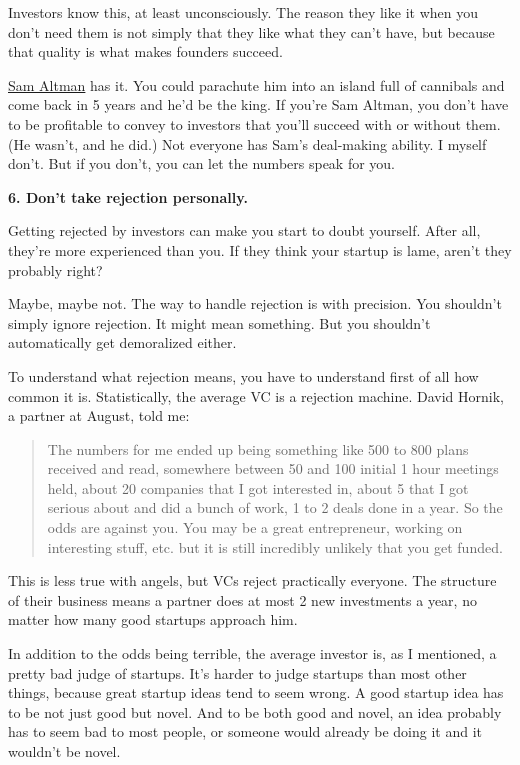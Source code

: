 Investors know this, at least unconsciously. The reason they like it
when you don't need them is not simply that they like what they can't
have, but because that quality is what makes founders succeed.

\href{http://www.youtube.com/watch?v=KhhId_WG7RA}{Sam Altman} has it.
You could parachute him into an island full of cannibals and come back
in 5 years and he'd be the king. If you're Sam Altman, you don't have to
be profitable to convey to investors that you'll succeed with or without
them. (He wasn't, and he did.) Not everyone has Sam's deal-making
ability. I myself don't. But if you don't, you can let the numbers speak
for you.

\textbf{6. Don't take rejection personally.}

Getting rejected by investors can make you start to doubt yourself.
After all, they're more experienced than you. If they think your startup
is lame, aren't they probably right?

Maybe, maybe not. The way to handle rejection is with precision. You
shouldn't simply ignore rejection. It might mean something. But you
shouldn't automatically get demoralized either.

To understand what rejection means, you have to understand first of all
how common it is. Statistically, the average VC is a rejection machine.
David Hornik, a partner at August, told me:

\begin{quote}
The numbers for me ended up being something like 500 to 800 plans
received and read, somewhere between 50 and 100 initial 1 hour meetings
held, about 20 companies that I got interested in, about 5 that I got
serious about and did a bunch of work, 1 to 2 deals done in a year. So
the odds are against you. You may be a great entrepreneur, working on
interesting stuff, etc. but it is still incredibly unlikely that you get
funded.
\end{quote}

This is less true with angels, but VCs reject practically everyone. The
structure of their business means a partner does at most 2 new
investments a year, no matter how many good startups approach him.

In addition to the odds being terrible, the average investor is, as I
mentioned, a pretty bad judge of startups. It's harder to judge startups
than most other things, because great startup ideas tend to seem wrong.
A good startup idea has to be not just good but novel. And to be both
good and novel, an idea probably has to seem bad to most people, or
someone would already be doing it and it wouldn't be novel.

